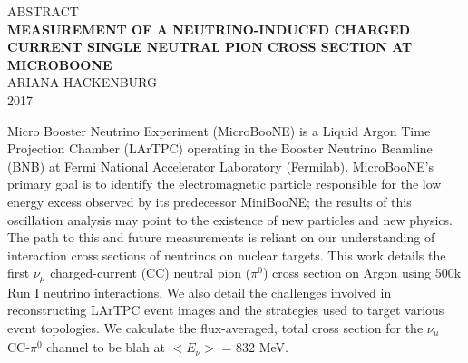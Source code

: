 \documentclass[12pt]{article}
\begin{document}
\begin{center}
{\footnotesize ABSTRACT}\\
\vspace{4 mm}
{\large \textbf{MEASUREMENT OF A NEUTRINO-INDUCED CHARGED CURRENT SINGLE NEUTRAL PION CROSS SECTION AT MICROBOONE}}\\
\vspace{6 mm}
{\footnotesize ARIANA HACKENBURG\\
2017\\}
\end{center}
Micro Booster Neutrino Experiment (MicroBooNE) is a Liquid Argon Time Projection Chamber (LArTPC) operating in the Booster Neutrino Beamline (BNB) at Fermi National Accelerator Laboratory (Fermilab). MicroBooNE's primary goal is to identify the electromagnetic particle responsible for the low energy excess observed by its predecessor MiniBooNE; the results of this oscillation analysis may point to the existence of new particles and new physics. The path to this and future measurements is reliant on our understanding of interaction cross sections of neutrinos on nuclear targets.  This work details the first $\nu_{\mu}$ charged-current (CC) neutral pion ($\pi^0$) cross section on Argon using 500k Run I neutrino interactions. We also detail the challenges involved in reconstructing LArTPC event images and the strategies used to target various event topologies. We calculate the flux-averaged, total cross section for the $\nu_{\mu}$ CC-$\pi^0$ channel to be blah at $<E_{\nu}>$ = 832 MeV.   


\thispagestyle{empty}
\clearpage
\end{document}
